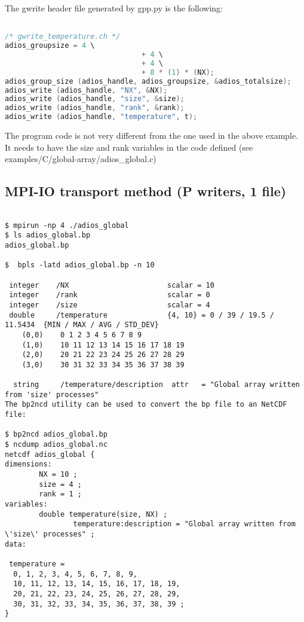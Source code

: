 The gwrite header file generated by gpp.py is the following:

\begin{lstlisting}[language=C,caption=gwrite header file generated from
  config.xml]

/* gwrite_temperature.ch */
adios_groupsize = 4 \
                                + 4 \
                                + 4 \
                                + 8 * (1) * (NX);
adios_group_size (adios_handle, adios_groupsize, &adios_totalsize);
adios_write (adios_handle, "NX", &NX);
adios_write (adios_handle, "size", &size);
adios_write (adios_handle, "rank", &rank);
adios_write (adios_handle, "temperature", t);

\end{lstlisting}

The program code is not very different from the one used in the above example. 
It needs to have the size and rank variables in the code defined (see examples/C/global-array/adios\_global.c) 

\subsection{MPI-IO transport method (P writers, 1 file)}

\begin{lstlisting}

$ mpirun -np 4 ./adios_global
$ ls adios_global.bp 
adios_global.bp

$  bpls -latd adios_global.bp -n 10
  
 integer    /NX                       scalar = 10
 integer    /rank                     scalar = 0
 integer    /size                     scalar = 4
 double     /temperature              {4, 10} = 0 / 39 / 19.5 / 11.5434  {MIN / MAX / AVG / STD_DEV}
    (0,0)    0 1 2 3 4 5 6 7 8 9
    (1,0)    10 11 12 13 14 15 16 17 18 19
    (2,0)    20 21 22 23 24 25 26 27 28 29
    (3,0)    30 31 32 33 34 35 36 37 38 39

  string     /temperature/description  attr   = "Global array written from 'size' processes"
The bp2ncd utility can be used to convert the bp file to an NetCDF file:

$ bp2ncd adios_global.bp
$ ncdump adios_global.nc 
netcdf adios_global {
dimensions:
        NX = 10 ;
        size = 4 ;
        rank = 1 ;
variables:
        double temperature(size, NX) ;
                temperature:description = "Global array written from \'size\' processes" ;
data:

 temperature =
  0, 1, 2, 3, 4, 5, 6, 7, 8, 9,
  10, 11, 12, 13, 14, 15, 16, 17, 18, 19,
  20, 21, 22, 23, 24, 25, 26, 27, 28, 29,
  30, 31, 32, 33, 34, 35, 36, 37, 38, 39 ;
}
\end{lstlisting}

